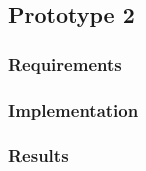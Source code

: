 \subsection{Prototype 2}
\subsubsection{Requirements}
\subsubsection{Implementation}
\subsubsection{Results}

